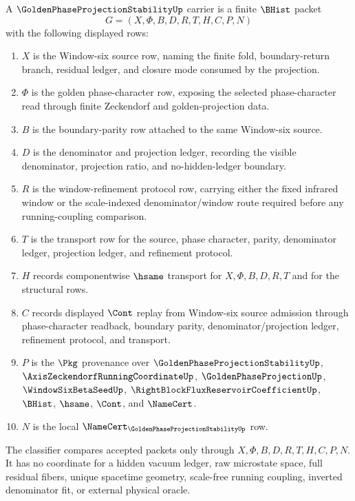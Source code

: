\begin{definition}
\label{def:golden-phase-projection-stability-carrier}
A $\GoldenPhaseProjectionStabilityUp$ carrier is a finite $\BHist$ packet
$$
G=(X,\Phi,B,D,R,T,H,C,P,N)
$$
with the following displayed rows:
\begin{enumerate}
\item $X$ is the Window-six source row, naming the finite fold, boundary-return branch, residual ledger, and closure mode consumed by the projection.
\item $\Phi$ is the golden phase-character row, exposing the selected phase-character read through finite Zeckendorf and golden-projection data.
\item $B$ is the boundary-parity row attached to the same Window-six source.
\item $D$ is the denominator and projection ledger, recording the visible denominator, projection ratio, and no-hidden-ledger boundary.
\item $R$ is the window-refinement protocol row, carrying either the fixed infrared window or the scale-indexed denominator/window route required before any running-coupling comparison.
\item $T$ is the transport row for the source, phase character, parity, denominator ledger, projection ledger, and refinement protocol.
\item $H$ records componentwise $\hsame$ transport for $X,\Phi,B,D,R,T$ and for the structural rows.
\item $C$ records displayed $\Cont$ replay from Window-six source admission through phase-character readback, boundary parity, denominator/projection ledger, refinement protocol, and transport.
\item $P$ is the $\Pkg$ provenance over $\GoldenPhaseProjectionStabilityUp$, $\AxisZeckendorfRunningCoordinateUp$, $\GoldenPhaseProjectionUp$, $\WindowSixBetaSeedUp$, $\RightBlockFluxReservoirCoefficientUp$, $\BHist$, $\hsame$, $\Cont$, and $\NameCert$.
\item $N$ is the local $\NameCert_{\GoldenPhaseProjectionStabilityUp}$ row.
\end{enumerate}
The classifier compares accepted packets only through $X,\Phi,B,D,R,T,H,C,P,N$. It has no coordinate for a hidden vacuum ledger, raw microstate space, full residual fibers, unique spacetime geometry, scale-free running coupling, inverted denominator fit, or external physical oracle.
\end{definition}

